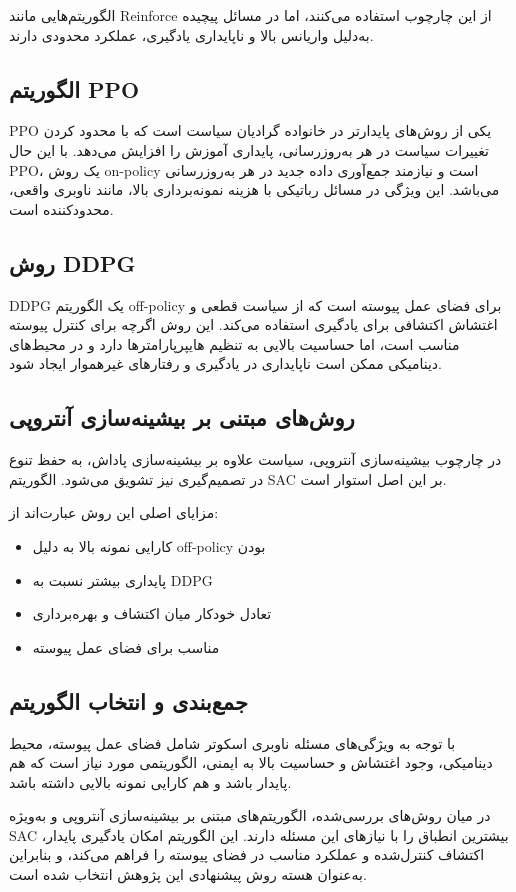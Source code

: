 الگوریتم‌هایی مانند Reinforce از این چارچوب استفاده می‌کنند، اما در مسائل پیچیده به‌دلیل واریانس بالا و ناپایداری یادگیری، عملکرد محدودی دارند.

\subsection{الگوریتم PPO}

PPO یکی از روش‌های پایدارتر در خانواده گرادیان سیاست است که با محدود کردن تغییرات سیاست در هر به‌روزرسانی، پایداری آموزش را افزایش می‌دهد\cite{Schulman2017PPO}. با این حال PPO، یک روش on-policy است و نیازمند جمع‌آوری داده جدید در هر به‌روزرسانی می‌باشد. این ویژگی در مسائل رباتیکی با هزینه نمونه‌برداری بالا، مانند ناوبری واقعی، محدودکننده است.

\subsection{روش DDPG}

DDPG یک الگوریتم off-policy برای فضای عمل پیوسته است که از سیاست قطعی و اغتشاش اکتشافی برای یادگیری استفاده می‌کند\cite{Lillicrap2016}. این روش اگرچه برای کنترل پیوسته مناسب است، اما حساسیت بالایی به تنظیم هایپرپارامترها دارد و در محیط‌های دینامیکی ممکن است ناپایداری در یادگیری و رفتارهای غیرهموار ایجاد شود.

\subsection{روش‌های مبتنی بر بیشینه‌سازی آنتروپی}

در چارچوب بیشینه‌سازی آنتروپی، سیاست علاوه بر بیشینه‌سازی پاداش، به حفظ تنوع در تصمیم‌گیری نیز تشویق می‌شود. الگوریتم SAC بر این اصل استوار است\cite{Haarnoja2018SAC}.

مزایای اصلی این روش عبارت‌اند از:
\begin{itemize}
	\item کارایی نمونه بالا به دلیل off-policy بودن
	\item پایداری بیشتر نسبت به DDPG
	\item تعادل خودکار میان اکتشاف و بهره‌برداری
	\item مناسب برای فضای عمل پیوسته
\end{itemize}

\subsection{جمع‌بندی و انتخاب الگوریتم}

با توجه به ویژگی‌های مسئله ناوبری اسکوتر شامل فضای عمل پیوسته، محیط دینامیکی، وجود اغتشاش و حساسیت بالا به ایمنی، الگوریتمی مورد نیاز است که هم پایدار باشد و هم کارایی نمونه بالایی داشته باشد.

در میان روش‌های بررسی‌شده، الگوریتم‌های مبتنی بر بیشینه‌سازی آنتروپی و به‌ویژه SAC بیشترین انطباق را با نیازهای این مسئله دارند. این الگوریتم امکان یادگیری پایدار، اکتشاف کنترل‌شده و عملکرد مناسب در فضای پیوسته را فراهم می‌کند، و بنابراین به‌عنوان هسته روش پیشنهادی این پژوهش انتخاب شده است.
